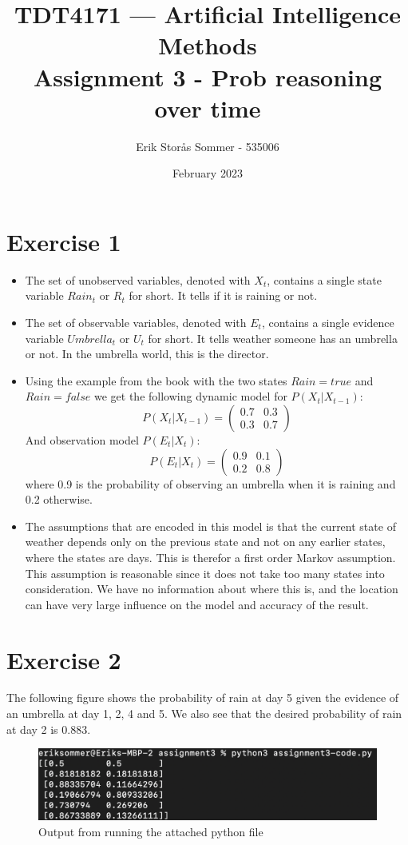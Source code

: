 \documentclass{article}
\title{TDT4171 — Artificial Intelligence Methods \\ Assignment 3 - Prob reasoning over time}
\author{Erik Storås Sommer - 535006}
\date{February 2023}
\begin{document}
\maketitle

\section*{Exercise 1}

\begin{itemize}
  \item The set of unobserved variables, denoted with \(X_t\), contains a single state variable \(Rain_t\) or \(R_t\) for short. It tells if it is raining or not.
  \item The set of observable variables, denoted with \(E_t\), contains a single evidence variable \(Umbrella_t\) or \(U_t\) for short. It tells weather someone has an umbrella or not. In the umbrella world, this is the director.
  \item Using the example from the book with the two states \(Rain=true\) and \(Rain=false\) we get the following dynamic model for \(P(X_t|X_{t-1})\):
  \[P(X_t|X_{t-1})= \begin{pmatrix} 0.7 & 0.3 \\ 0.3 & 0.7 \end{pmatrix}\]
  And observation model \(P(E_t|X_t)\):
  \[P(E_t|X_t)= \begin{pmatrix} 0.9 & 0.1 \\ 0.2 & 0.8 \end{pmatrix}\]
  where 0.9 is the probability of observing an umbrella when it is raining and 0.2 otherwise.
  \item The assumptions that are encoded in this model is that the current state of weather depends only on the previous state and not on any earlier states, where the states are days. This is therefor a first order Markov assumption. This assumption is reasonable since it does not take too many states into consideration. We have no information about where this is, and the location can have very large influence on the model and accuracy of the result.
\end{itemize}

\section*{Exercise 2}

The following figure shows the probability of rain at day 5 given the evidence of an umbrella at day 1, 2, 4 and 5. We also see that the desired probability of rain at day 2 is 0.883.

\begin{figure}[hbtp]
  \includegraphics[width=\linewidth]{images/output.png}
  \caption{Output from running the attached python file}
  \label{fig:boat1}
\end{figure}
\end{document}
